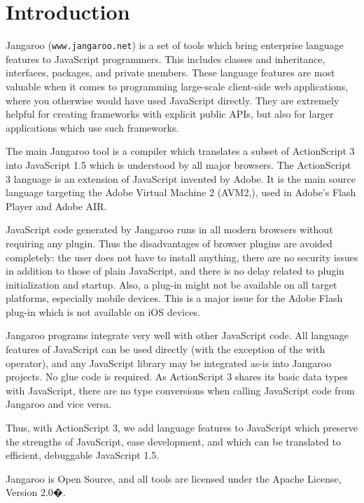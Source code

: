 \documentclass[11pt]{sigplanconf}
\begin{document}
\section{Introduction}

Jangaroo (\texttt{www.jangaroo.net}) is a set of tools which bring enterprise language features to JavaScript programmers. This includes classes and inheritance, interfaces, packages, and private members. These language features are most valuable when it comes to programming large-scale client-side web applications, where you otherwise would have used JavaScript directly. They are extremely helpful for creating frameworks with explicit public APIs, but also for larger applications which use such frameworks.

The main Jangaroo tool is a compiler which translates a subset of ActionScript 3\citep{as3-overview} into JavaScript 1.5 which is understood by all major browsers.  The ActionScript 3 language is an extension of JavaScript invented by Adobe. It is the main source language targeting the Adobe Virtual Machine 2 (AVM2,\citep{avm2}), used in Adobe's Flash Player\citep{flashplayer} and Adobe AIR\citep{air}.

JavaScript code generated by Jangaroo runs in all modern browsers without requiring any plugin. Thus the disadvantages of browser plugins are avoided completely: the user does not have to install anything, there are no security issues in addition to those of plain JavaScript, and there is no delay related to plugin initialization and startup. Also, a plug-in might not be available on all target platforms, especially mobile devices. This is a major issue for the Adobe Flash plug-in which is not available on iOS devices.

Jangaroo programs integrate very well with other JavaScript code. All language features of JavaScript can be used directly (with the exception of the with operator), and any JavaScript library may be integrated as-is into Jangaroo projects. No glue code is required. As ActionScript 3 shares its basic data types with JavaScript, there are no type conversions when calling JavaScript code from Jangaroo and vice versa.

Thus, with ActionScript 3, we add language features to JavaScript which preserve the strengths of JavaScript, ease development, and which can be translated to efficient, debuggable JavaScript 1.5.

Jangaroo is Open Source, and all tools are licensed under the Apache License, Version 2.0�\citep{joolicense}.
\end{document}
